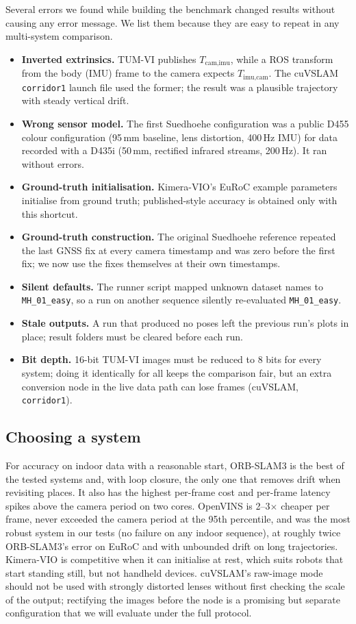 \documentclass[conference,a4paper]{IEEEtran}
\newcommand{\ds}[1]{\texttt{#1}}
\newcommand{\MHe}{\ds{MH\_01\_easy}}
\newcommand{\corr}{\ds{corridor1}}
\newcommand{\sued}{Suedhoehe}
\begin{document}
Several errors we found while building the benchmark changed results without causing any
error message. We list them because they are easy to repeat in any multi-system comparison.
\begin{itemize}
  \item \textbf{Inverted extrinsics.} TUM-VI publishes $T_{\text{cam,imu}}$, while a ROS
        transform from the body (IMU) frame to the camera expects $T_{\text{imu,cam}}$. The
        cuVSLAM \corr{} launch file used the former; the result was a plausible trajectory with
        steady vertical drift.
  \item \textbf{Wrong sensor model.} The first \sued{} configuration was a public D455 colour
        configuration (95\,mm baseline, lens distortion, 400\,Hz IMU) for data recorded with a
        D435i (50\,mm, rectified infrared streams, 200\,Hz). It ran without errors.
  \item \textbf{Ground-truth initialisation.} Kimera-VIO's EuRoC example parameters initialise
        from ground truth; published-style accuracy is obtained only with this shortcut.
  \item \textbf{Ground-truth construction.} The original \sued{} reference repeated the last
        GNSS fix at every camera timestamp and was zero before the first fix; we now use the
        fixes themselves at their own timestamps.
  \item \textbf{Silent defaults.} The runner script mapped unknown dataset names to \MHe{},
        so a run on another sequence silently re-evaluated \MHe{}.
  \item \textbf{Stale outputs.} A run that produced no poses left the previous run's plots in
        place; result folders must be cleared before each run.
  \item \textbf{Bit depth.} 16-bit TUM-VI images must be reduced to 8 bits for every system;
        doing it identically for all keeps the comparison fair, but an extra conversion node in
        the live data path can lose frames (cuVSLAM, \corr{}).
\end{itemize}

\subsection{Choosing a system}

For accuracy on indoor data with a reasonable start, ORB-SLAM3 is the best of the tested systems
and, with loop closure, the only one that removes drift when revisiting places. It also has the
highest per-frame cost and per-frame latency spikes above the camera period on two cores.
OpenVINS is 2--3$\times$ cheaper per frame, never exceeded the camera period at the 95th
percentile, and was the most robust system in our tests (no failure on any indoor sequence), at
roughly twice ORB-SLAM3's error on EuRoC and with unbounded drift on long trajectories.
Kimera-VIO is competitive when it can initialise at rest, which suits robots that start
standing still, but not handheld devices. cuVSLAM's raw-image mode should not be used with
strongly distorted lenses without first checking the scale of the output; rectifying the images
before the node is a promising but separate configuration that we will evaluate under the full
protocol.
\end{document}
